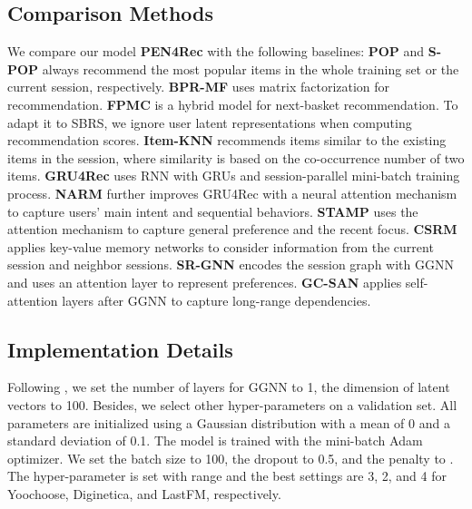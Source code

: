 \documentclass[runningheads]{llncs}
\begin{document}
\subsection{Comparison Methods}
We compare our model \textbf{PEN4Rec} with the following baselines:
\textbf{POP} and \textbf{S-POP} always recommend the most popular items in the whole training set or the current session, respectively.
\textbf{BPR-MF} \cite{DBLP:conf/uai/RendleFGS09} uses matrix factorization for recommendation. 
\textbf{FPMC} \cite{DBLP:conf/www/RendleFS10} is a hybrid model for next-basket recommendation. To adapt it to SBRS, we ignore user latent representations when computing recommendation scores.
\textbf{Item-KNN} \cite{DBLP:conf/www/SarwarKKR01} recommends items similar to the existing items in the session, where similarity is based on the co-occurrence number of two items.
\textbf{GRU4Rec} \cite{DBLP:journals/corr/HidasiKBT15} uses RNN with GRUs and session-parallel mini-batch training process.
\textbf{NARM} \cite{DBLP:conf/cikm/LiRCRLM17} further improves GRU4Rec with a neural attention mechanism to capture users' main intent and sequential behaviors.
\textbf{STAMP} \cite{DBLP:conf/kdd/LiuZMZ18} uses the attention mechanism to capture general preference and the recent focus.
\textbf{CSRM} \cite{DBLP:conf/sigir/WangRMCMR19} applies key-value memory networks to consider information from the current session and neighbor sessions.
\textbf{SR-GNN} \cite{DBLP:conf/aaai/WuT0WXT19} encodes the session graph with GGNN and uses an attention layer to represent preferences. 
\textbf{GC-SAN} \cite{DBLP:conf/ijcai/XuZLSXZFZ19} applies self-attention layers after GGNN to capture long-range dependencies.

 
\subsection{Implementation Details}
Following \cite{DBLP:conf/aaai/WuT0WXT19}, we set the number of layers for GGNN to 1, the dimension of latent vectors to 100.
Besides, we select other hyper-parameters on a validation set.
All parameters are initialized using a Gaussian distribution with a mean of 0 and a standard deviation of 0.1.
The model is trained with the mini-batch Adam optimizer.
We set the batch size to 100, the dropout to 0.5, and the  penalty to .
The hyper-parameter  is set with range  and the best settings are 3, 2, and 4 for Yoochoose, Diginetica, and LastFM, respectively. 
\end{document}
